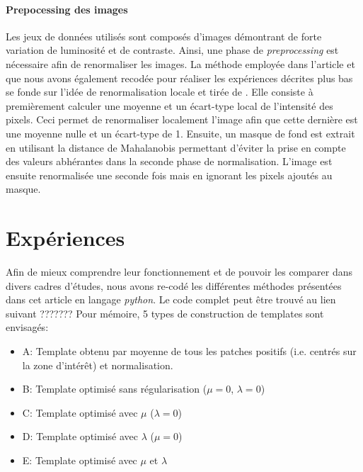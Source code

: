 \documentclass{article}
\begin{document}
\paragraph{Prepocessing des images}
Les jeux de données utilisés sont composés d'images démontrant de forte variation de luminosité et de contraste. Ainsi, une 
phase de \textit{preprocessing} est nécessaire afin de renormaliser les images. La méthode employée dans l'article et que nous 
avons également recodée pour réaliser les expériences décrites plus bas se fonde sur l'idée de renormalisation locale et tirée de \cite{preprocessing}. Elle consiste
à premièrement calculer une moyenne et un écart-type local de l'intensité des pixels. Ceci permet de renormaliser localement l'image afin 
que cette dernière est une moyenne nulle et un écart-type de 1. Ensuite, un masque de fond est extrait en utilisant la distance de Mahalanobis 
permettant d'éviter la prise en compte des valeurs abhérantes dans la seconde phase de normalisation. L'image est ensuite renormalisée une seconde 
fois mais en ignorant les pixels ajoutés au masque.



\section{Expériences}

Afin de mieux comprendre leur fonctionnement et de pouvoir les comparer dans 
divers cadres d'études, nous avons re-codé les différentes méthodes présentées dans cet article 
en langage \textit{python}. Le code complet peut être trouvé au lien suivant ???????
Pour mémoire, 5 types de construction de templates sont envisagés:
\begin{itemize}
    \item A: Template obtenu par moyenne de tous les patches positifs (i.e. centrés sur la zone d'intérêt) et normalisation.
    \item B: Template optimisé sans régularisation ($\mu =0$, $\lambda = 0$)
    \item C: Template optimisé avec $\mu$ ($\lambda=0$)
    \item D: Template optimisé avec $\lambda$ ($\mu = 0$)
    \item E: Template optimisé avec $\mu$ et $\lambda$
\end{itemize}
\end{document}
